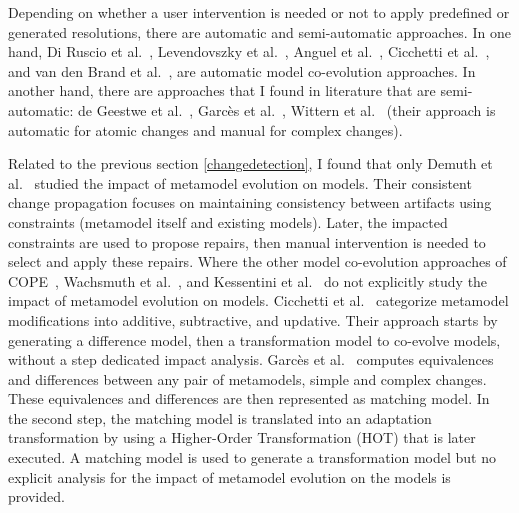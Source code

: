 Depending on whether a user intervention is needed or not to apply predefined or generated resolutions, there are automatic and semi-automatic approaches.
In one hand, Di Ruscio et al.~\cite{10.1007/978-3-642-33654-62}, Levendovszky et al.~\cite{levendovszky2014semi}, Anguel et al.~\cite{anguel2013towards,anguel2014using}, Cicchetti et al.~\cite{cicchetti2008automating}, and van den Brand et al.~\cite{van2011generic}, are automatic model co-evolution approaches.
In another hand, there are approaches that I found in literature that are semi-automatic: de Geestwe et al.~\cite{de2008generating}, Garcès et al.~\cite{garces2014adapting}, Wittern et al.~\cite{wittern2013determining} (their approach is automatic for atomic changes and manual for complex changes).

Related to the previous section \ref{changedetection}, I found that only Demuth et al.~\cite{demuth2016co} studied the impact of metamodel evolution on models. Their consistent change propagation focuses on maintaining consistency between artifacts using constraints (metamodel itself and existing models). Later, the impacted constraints are used to propose repairs, then manual intervention is needed to select and apply these repairs. Where the other model co-evolution approaches of COPE~\cite{herrmannsdoerfer2009cope}, Wachsmuth et al.~\cite{wachsmuth2007metamodel}, and Kessentini et al.~\cite{kessentini2018integrating,kessentini2020interactive} do not explicitly study the impact of metamodel evolution on models. Cicchetti et al.~\cite{cicchetti2008automating} categorize metamodel modifications  into additive, subtractive, and updative. Their approach starts by generating a difference model, then a transformation model to co-evolve models, without a step dedicated impact analysis.
Garcès et al.~\cite{garces2009managing} computes equivalences and differences between any pair of metamodels, simple and complex changes. These equivalences and differences are then represented as matching model. In the second step, the matching model is translated into an adaptation transformation by using a Higher-Order Transformation (HOT) that is later executed. A matching model is used to generate a transformation model but no explicit analysis for the impact of metamodel evolution on the models is provided.



